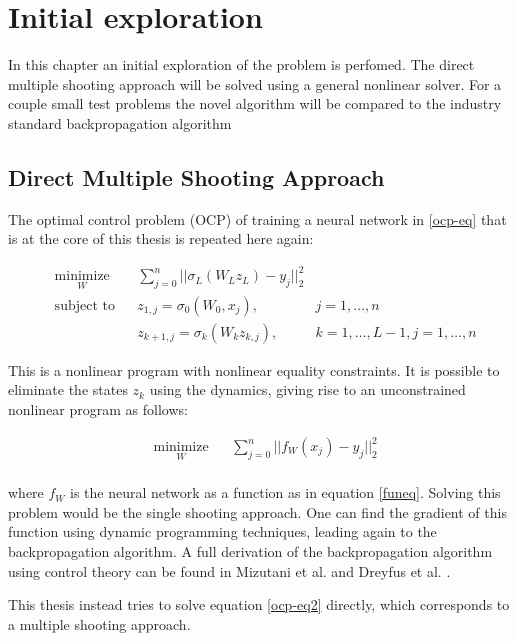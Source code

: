 \chapter{Initial exploration}
\label{cha:1}
In this chapter an initial exploration of the problem is perfomed. The direct multiple shooting approach will be solved using a general nonlinear solver. For a couple small test problems the novel algorithm will be compared to the industry standard backpropagation algorithm

\section{Direct Multiple Shooting Approach}
The optimal control problem (OCP) of training a neural network in \ref{ocp-eq} that is at the core of this thesis is repeated here again:

\begin{equation}
	\begin{aligned}
	& \underset{W}{\text{minimize}}
	& & \sum\limits_{j=0}^{n}||\sigma_L(W_Lz_L) - y_j||^2_2 \\
	& \text{subject to}
	& & z_{1,j} = \sigma_0(W_0,x_j), &j = 1,\ldots,n \\
	& & & z_{k+1,j} = \sigma_k(W_kz_{k,j}), &k = 1,\ldots,L-1,j = 1,\ldots,n
	\end{aligned}
	\label{ocp-eq2}
\end{equation}

This is a nonlinear program with nonlinear equality constraints. It is possible to eliminate the states $z_k$ using the dynamics, giving rise to an unconstrained nonlinear program as follows:

\begin{equation}
	\begin{aligned}
	& \underset{W}{\text{minimize}}
	& & \sum\limits_{j=0}^{n}||f_W(x_j) - y_j||^2_2 \\
	\end{aligned}
\end{equation}

where $f_W$ is the neural network as a function as in equation \ref{funeq}. Solving this problem would be the single shooting approach. One can find the gradient of this function using dynamic programming techniques, leading again to the backpropagation algorithm. A full derivation of the backpropagation algorithm using control theory can be found in Mizutani et al. \cite{mizutani2000} and Dreyfus et al. \cite{dreyfus1990}.

This thesis instead tries to solve equation \ref{ocp-eq2} directly, which corresponds to a multiple shooting approach.

